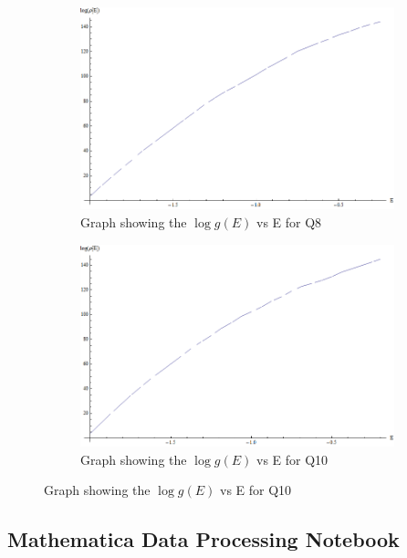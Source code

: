 \begin{figure}[H]
\begin{subfigure}[b]{0.45\textwidth}
    \includegraphics[width=\textwidth]{7-Appendices/intQ8Log(rho(E)).png}
    \caption{Graph showing the $\log{g\left(E\right)}$ vs E for Q8}
\end{subfigure}
\begin{subfigure}[b]{0.45\textwidth}
    \includegraphics[width=\textwidth]{7-Appendices/intQ10Log(rho(E)).png}
    \caption{Graph showing the $\log{g\left(E\right)}$ vs E for Q10}
\end{subfigure}
\end{figure}

\subsection{Mathematica Data Processing Notebook}
\label{subsec:MathematicaNotebook}


